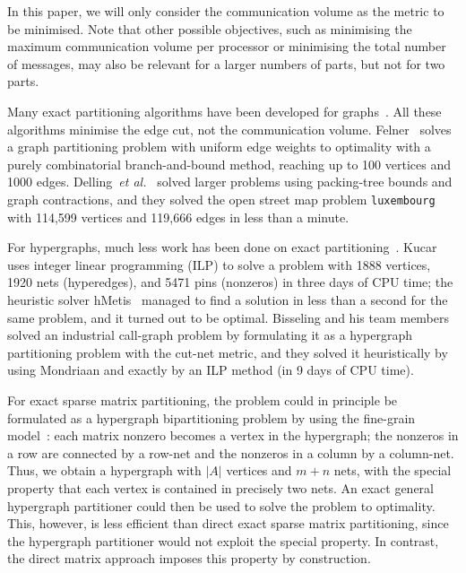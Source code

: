 In this paper, we will only consider the communication volume
as the metric to be minimised. 
Note that other possible objectives, such as 
minimising the maximum communication volume per processor
or minimising the total number of messages, 
may also be relevant for a larger numbers of parts,
but not for two parts.

Many exact partitioning algorithms have been developed for graphs~\cite{karisch00,sensen01,felner05,hager13,delling14}. All these algorithms minimise the edge cut,
not the communication volume.
Felner~\cite{felner05} solves a graph partitioning problem
with uniform edge weights to optimality
with a purely combinatorial branch-and-bound method,
reaching up to 100 vertices and 1000 edges.
Delling~\textit{et al.\ }\cite{delling14} solved larger problems
using packing-tree bounds and graph contractions, and they solved 
the open street map problem \texttt{luxembourg} with
114,599 vertices and 119,666 edges in less than a minute.

For hypergraphs, much less work has been
done on exact partitioning~\cite{caldwell00,kucar04,bisseling05}.
Kucar~\cite{kucar04} uses integer linear programming (ILP) 
to solve a problem with 1888 vertices, 1920 nets (hyperedges), and 5471
pins (nonzeros) in three days of CPU time; the heuristic solver
hMetis~\cite{karypis99b}
managed to find a solution in less than a second for the same problem,
and it turned out to be optimal.
Bisseling and his team members~\cite{bisseling05}
solved an industrial call-graph problem
by formulating it as a hypergraph partitioning problem with the cut-net metric,
and they solved it heuristically by using Mondriaan
and exactly by an ILP method (in 9 days of CPU time).

For exact sparse matrix partitioning,
the problem could in principle be formulated
as a hypergraph bipartitioning problem by using
the fine-grain model~\cite{catalyurek01}:
each matrix nonzero becomes a vertex in the hypergraph;
the nonzeros in a row are connected by a row-net  
and the nonzeros in a column by a column-net.
Thus, we obtain a hypergraph with $|A|$ vertices and $m+n$ nets,
with the special property that each vertex is
contained in precisely two nets.
An exact general hypergraph partitioner could then be used to solve
the problem to optimality. 
This, however, is less efficient than direct exact sparse matrix partitioning,
since the hypergraph partitioner would not exploit the special property.
In contrast, the direct matrix approach imposes this property
by construction.


